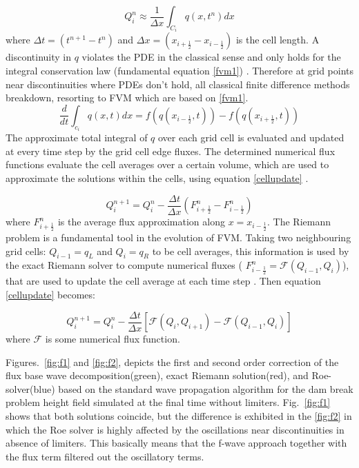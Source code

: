 \documentclass[12pt,a4paper]{article}
\newcommand{\donna}[1]{{\color{red}{#1}}}
\begin{document}
	\begin{equation}
		Q_{i}^{n} \approx \dfrac{1}{\Delta x} \int_{C_{i}}q(x,t^{n})dx
		\label{wpa0}
	\end{equation}
	where $\Delta t = (t^{n+1} - t^{n})$ and  $\Delta x = (x_{i+\frac{1}{2}} - x_{i-\frac{1}{2}})$ is the cell length. A discontinuity in $q$ violates the PDE in the classical sense and only holds for the integral conservation law (fundamental equation \eqref{fvm1}) \cite{leveque2002finite}. Therefore at grid points near discontinuities where PDEs don't hold, all classical finite difference methods breakdown, resorting to FVM which are based on \eqref{fvm1}. 	
	\begin{equation}
		\frac{d}{dt} \int_{c_{i}} q(x,t)dx = f(q(x_{i-\frac{1}{2}},t)) -  f(q(x_{i+\frac{1}{2}},t))
		\label{fvm1}
	\end{equation}	
	The approximate  total integral of $q$ over each grid cell is evaluated and updated at every time step by the grid cell edge fluxes. The determined numerical flux functions evaluate the  cell averages over a certain volume, which are used to approximate the solutions within the cells, using equation \eqref{cellupdate} \cite{le-ge-be:2011}.
	
	\begin{equation}
		Q_{i}^{n+1} = Q_{i}^{n} - \frac{\Delta t}{\Delta x} (F_{i+\frac{1}{2}}^{n} - F_{i-\frac{1}{2}}^{n})
		\label{cellupdate}
	\end{equation}	
	where $F_{i+\frac{1}{2}}^{n} $ is the average flux approximation along $x=x_{i-\frac{1}{2}}$.
	The Riemann problem is a fundamental tool in the evolution of FVM. Taking two neighbouring grid cells: $Q_{i-1} = q_{L}$ and $Q_{i} = q_{R}$ to be cell averages, this information is used by the exact Riemann solver to compute numerical fluxes ( $F_{i-\frac{1}{2}}^{n} = \mathcal{F}(Q_{i-1} , Q_{i} )$), that are used to update the cell average at each time step \cite{ba-le-mi-ro:2003}. Then equation \eqref{cellupdate} becomes:
	
	\begin{equation}
		Q_{i}^{n+1} = Q_{i}^{n} - \frac{\Delta t}{\Delta x} \left[ \mathcal{F}(Q_{i} , Q_{i+1} ) - \mathcal{F}(Q_{i-1} , Q_{i} ) \right]
		\label{cellupdat}
	\end{equation}
	where $\mathcal{F}$ is some numerical flux function.  \donna{Can you connect the numerical flux function to the Riemann problem?}

	\donna{This section will have to be modified so you can mention the exact solver and approximate solver....}
	Figures.~\ref{fig:f1} and \ref{fig:f2}, depicts the first and second order correction of the flux base wave decomposition(green), exact Riemann solution(red), and Roe-solver(blue) based on the standard wave propagation algorithm \cite{le:2002} for the dam break problem height field simulated at the final time without limiters. Fig.~\ref{fig:f1}  shows that both solutions coincide, but the difference is exhibited in the \ref{fig:f2} in which the Roe solver is highly affected by the oscillations near discontinuities in absence of limiters. This basically means that the f-wave approach together with the flux term filtered out the oscillatory terms.
	
\end{document}
